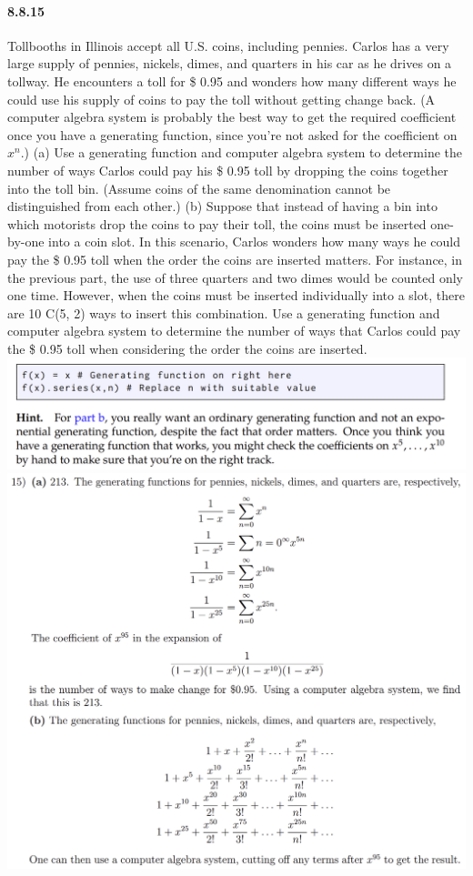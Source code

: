 \documentclass{article}
\begin{document}
\paragraph{8.8.15}Tollbooths in Illinois accept all U.S. coins, including pennies. Carlos has a very
large supply of pennies, nickels, dimes, and quarters in his car as he drives on a tollway. He encounters a toll for \$ 0.95 and wonders how many different ways he could
use his supply of coins to pay the toll without getting change back. (A computer algebra system is probably the best way to get the required coefficient once you have a
generating function, since you’re not asked for the coefficient on $x^n$.)\newline
(a) Use a generating function and computer algebra system to determine the number
of ways Carlos could pay his \$ 0.95 toll by dropping the coins together into the
toll bin. (Assume coins of the same denomination cannot be distinguished from
each other.)\newline
(b) Suppose that instead of having a bin into which motorists drop the coins to pay
their toll, the coins must be inserted one-by-one into a coin slot. In this scenario,
Carlos wonders how many ways he could pay the \$ 0.95 toll when the order the
coins are inserted matters. For instance, in the previous part, the use of three quarters and two dimes would be counted only one time. However, when the coins must be inserted individually into a slot, there are 10  C(5, 2) ways to insert this
combination. Use a generating function and computer algebra system to determine the number of ways that Carlos could pay the \$ 0.95 toll when considering
the order the coins are inserted.\newline
\includegraphics{0020}\newline
\includegraphics{0021}
\end{document}
